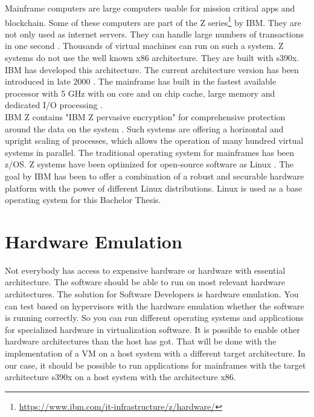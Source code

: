 Mainframe computers are large computers usable for mission critical apps and blockchain. Some of these computers are part of the Z series\footnote{\url{https://www.ibm.com/it-infrastructure/z/hardware/}} by IBM. They are not only used as internet servers. They can handle large numbers of transactions in one second \cite[~p.56]{Tanenbaum2014}. 
Thousands of virtual machines can run on such a system. Z systems do not use the well known x86 architecture. 
They are built with s390x. IBM has developed this architecture. The current architecture version has been introduced in late 2000 \cite[~p.15]{Block2019}. The mainframe has built in the fastest available processor with 5 GHz with on core and on chip cache, large memory and dedicated I/O processing \cite{OpenMainframeProject}.\\
IBM Z contains "IBM Z pervasive encryption" for comprehensive protection around the data on the system \cite[~p.4]{Lascu2020}. Such systems are offering a horizontal and upright \gls{scaling} of processes, which allows the operation of many hundred virtual systems in parallel\cite[~p.13]{Tschoeke2009}. The traditional operating system for mainframes has been z/OS. 
Z systems have been optimized for open-source software as Linux \cite[~p.8]{Lascu2020}. The goal by IBM has been to offer a combination of a robust and securable hardware platform with the power of different Linux distributions. 
Linux is used as a base operating system for this Bachelor Thesis.


\section{Hardware Emulation}

Not everybody has access to expensive hardware or hardware with essential architecture. The software should be able to run on most relevant hardware architectures. The solution for Software Developers is hardware emulation. 
You can test based on hypervisors with the hardware emulation whether the software is running correctly. 
So you can run different operating systems and applications for specialized hardware in virtualization software. 
It is possible to enable other hardware architectures than the host has got. 
That will be done with the implementation of a \gls{VM} on a host system with a different target architecture\cite[~p.3]{Rosenthal2015}. In our case, it should be possible to run applications for mainframes with the target
architecture s390x on a host system with the architecture x86.


